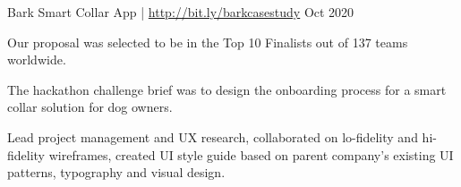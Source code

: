 \begin{cventries2}
\vspace{2mm}
	\cventrymini
	{Bark Smart Collar App | \footnotesize \textnormal{\href{http://bit.ly/barkcasestudy}{http://bit.ly/barkcasestudy}}} %
	{Oct 2020} %
	{
		\begin{cvitems} 
			\item {Our proposal was selected to be in the Top 10 Finalists out of 137 teams worldwide.}
			\item {The hackathon challenge brief was to design the onboarding process for a smart collar solution for dog owners.}
			\item{Lead project management and UX research, collaborated on lo-fidelity and hi-fidelity wireframes, created UI style guide based on parent company's existing UI patterns, typography and visual design.}
		\end{cvitems}
	} %
\end{cventries2}    





